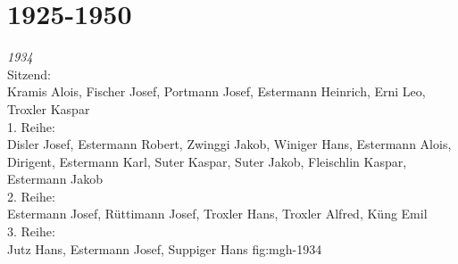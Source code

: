 \documentclass[]{book}
\begin{document}
\section{1925-1950}


{\emph{1934}\\
    Sitzend:\\
    Kramis Alois, Fischer Josef, Portmann Josef, Estermann Heinrich, Erni Leo,
    Troxler Kaspar\\
    1. Reihe:\\
    Disler Josef, Estermann Robert, Zwinggi Jakob, Winiger Hans, Estermann
    Alois, Dirigent, Estermann Karl, Suter Kaspar, Suter Jakob, Fleischlin
    Kaspar, Estermann Jakob\\
    2. Reihe:\\
    Estermann Josef, Rüttimann Josef, Troxler Hans, Troxler Alfred, Küng Emil\\
    3. Reihe:\\
    Jutz Hans, Estermann Josef, Suppiger Hans }
{fig:mgh-1934}
\end{document}
